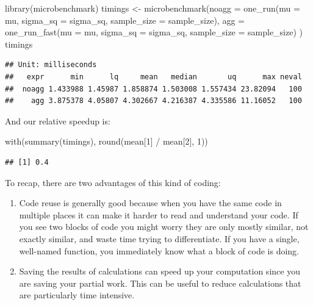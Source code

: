 \documentclass[
]{book}
\newenvironment{Shaded}{\begin{snugshade}}{\end{snugshade}}
\newcommand{\AttributeTok}[1]{\textcolor[rgb]{0.77,0.63,0.00}{#1}}
\newcommand{\DecValTok}[1]{\textcolor[rgb]{0.00,0.00,0.81}{#1}}
\newcommand{\FunctionTok}[1]{\textcolor[rgb]{0.00,0.00,0.00}{#1}}
\newcommand{\NormalTok}[1]{#1}
\newcommand{\OtherTok}[1]{\textcolor[rgb]{0.56,0.35,0.01}{#1}}
\newcommand{\SpecialCharTok}[1]{\textcolor[rgb]{0.00,0.00,0.00}{#1}}
\begin{document}
\begin{Shaded}
\begin{Highlighting}[]
\FunctionTok{library}\NormalTok{(microbenchmark)}
\NormalTok{timings }\OtherTok{\textless{}{-}} \FunctionTok{microbenchmark}\NormalTok{(}\AttributeTok{noagg =} \FunctionTok{one\_run}\NormalTok{(}\AttributeTok{mu =}\NormalTok{ mu, }\AttributeTok{sigma\_sq =}\NormalTok{ sigma\_sq, }
                                          \AttributeTok{sample\_size =}\NormalTok{ sample\_size),}
                          \AttributeTok{agg =} \FunctionTok{one\_run\_fast}\NormalTok{(}\AttributeTok{mu =}\NormalTok{ mu, }\AttributeTok{sigma\_sq =}\NormalTok{ sigma\_sq, }
                                             \AttributeTok{sample\_size =}\NormalTok{ sample\_size) )}
\NormalTok{timings}
\end{Highlighting}
\end{Shaded}

\begin{verbatim}
## Unit: milliseconds
##   expr      min      lq     mean   median       uq      max neval
##  noagg 1.433988 1.45987 1.858874 1.503008 1.557434 23.82094   100
##    agg 3.875378 4.05807 4.302667 4.216387 4.335586 11.16052   100
\end{verbatim}

And our relative speedup is:

\begin{Shaded}
\begin{Highlighting}[]
\FunctionTok{with}\NormalTok{(}\FunctionTok{summary}\NormalTok{(timings), }\FunctionTok{round}\NormalTok{(mean[}\DecValTok{1}\NormalTok{] }\SpecialCharTok{/}\NormalTok{ mean[}\DecValTok{2}\NormalTok{], }\DecValTok{1}\NormalTok{))}
\end{Highlighting}
\end{Shaded}

\begin{verbatim}
## [1] 0.4
\end{verbatim}

To recap, there are two advantages of this kind of coding:

\begin{enumerate}
\def\labelenumi{\arabic{enumi}.}
\item
  Code reuse is generally good because when you have the same code in multiple places it can make it harder to read and understand your code. If you see two blocks of code you might worry they are only mostly similar, not exactly similar, and waste time trying to differentiate. If you have a single, well-named function, you immediately know what a block of code is doing.
\item
  Saving the results of calculations can speed up your computation since you are saving your partial work. This can be useful to reduce calculations that are particularly time intensive.
\end{enumerate}
\end{document}

